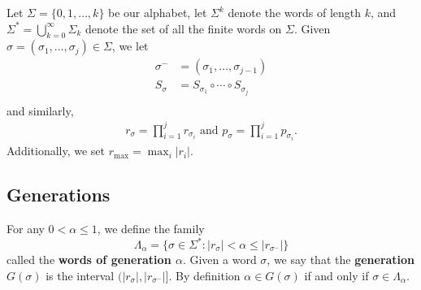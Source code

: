 \documentclass[11pt, a4paper]{memoir}
\newcommand{\mbf}[1]{{\boldmath\bfseries #1}}
\theoremstyle{change}
\theoremstyle{plain}
\theoremstyle{nonumberplain}
\numberwithin{equation}{section}
\begin{document}
Let $\Sigma=\{0,1,\ldots,k\}$ be our alphabet, let $\Sigma^k$ denote the words of length $k$, and $\Sigma^*=\bigcup_{k=0}^\infty\Sigma_k$ denote the set of all the finite words on $\Sigma$.
Given $\sigma=(\sigma_1,\ldots,\sigma_j)\in\Sigma$, we let
\begin{align*}
    \sigma^- &=(\sigma_1,\ldots,\sigma_{j-1})\\
    S_\sigma &= S_{\sigma_1}\circ\cdots\circ S_{\sigma_j}\\
\end{align*}
and similarly,
\begin{align*}
    r_\sigma = \prod_{i=1}^j r_{\sigma_i}\text{ and }p_\sigma = \prod_{i=1}^j p_{\sigma_i}.
\end{align*}
Additionally, we set $r_{\max}=\max_{i}|r_i|$.

\subsection{Generations}
For any $0<\alpha\leq 1$, we define the family
\begin{equation*}
    \Lambda_\alpha=\{\sigma\in\Sigma^*:|r_\sigma|<\alpha\leq|r_{\sigma^-}|\}
\end{equation*}
called the \mbf{words of generation $\alpha$}.
Given a word $\sigma$, we say that the \textbf{generation} $G(\sigma)$ is the interval $(|r_\sigma|,|r_{\sigma^-}|]$.
By definition $\alpha\in G(\sigma)$ if and only if $\sigma\in\Lambda_\alpha$.
\end{document}
